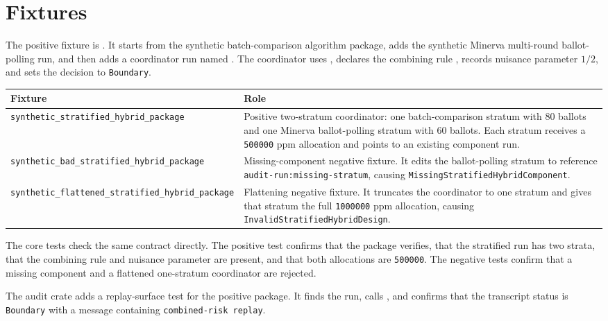 \section{Fixtures}

The positive fixture is
. It starts from the synthetic
batch-comparison algorithm package, adds the synthetic Minerva multi-round
ballot-polling run, and then adds a coordinator run named
. The coordinator uses
, declares the combining rule
, records nuisance parameter $1/2$, and
sets the decision to \texttt{Boundary}.

\begin{center}
\small
\begin{tabularx}{\textwidth}{lX}
\toprule
Fixture & Role \\
\midrule
\texttt{synthetic\_stratified\_hybrid\_package} & Positive two-stratum coordinator: one batch-comparison stratum with 80 ballots and one Minerva ballot-polling stratum with 60 ballots. Each stratum receives a \texttt{500000} ppm allocation and points to an existing component run. \\
\texttt{synthetic\_bad\_stratified\_hybrid\_package} & Missing-component negative fixture. It edits the ballot-polling stratum to reference \texttt{audit-run:missing-stratum}, causing \texttt{MissingStratifiedHybridComponent}. \\
\texttt{synthetic\_flattened\_stratified\_hybrid\_package} & Flattening negative fixture. It truncates the coordinator to one stratum and gives that stratum the full \texttt{1000000} ppm allocation, causing \texttt{InvalidStratifiedHybridDesign}. \\
\bottomrule
\end{tabularx}
\end{center}

The core tests check the same contract directly. The positive test confirms
that the package verifies, that the stratified run has two strata, that the
combining rule and nuisance parameter are present, and that both allocations
are \texttt{500000}. The negative tests confirm that a missing component and a
flattened one-stratum coordinator are rejected.

The audit crate adds a replay-surface test for the positive package. It finds
the  run, calls
, and confirms that the transcript
status is \texttt{Boundary} with a message containing \texttt{combined-risk
replay}.
